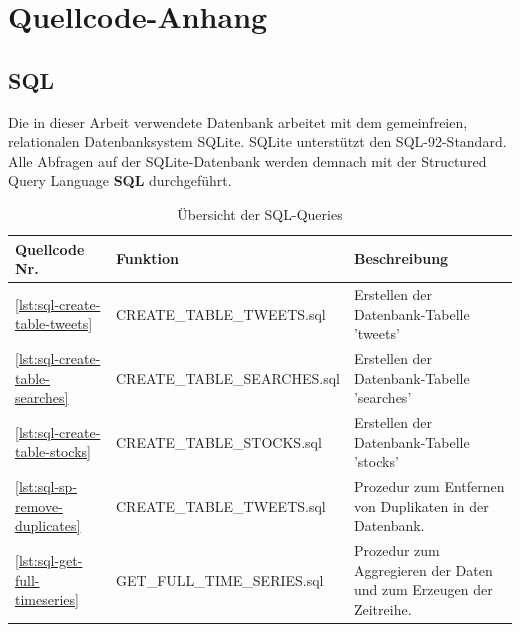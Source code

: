 \documentclass[
	a4paper,
	12pt,
	bibliography=totocnumbered,
	twoside,
]{scrreprt}
\begin{document}
\chapter{Quellcode-Anhang}

\section{SQL}
Die in dieser Arbeit verwendete Datenbank arbeitet mit dem gemeinfreien, relationalen Datenbanksystem SQLite. SQLite unterstützt den SQL-92-Standard. Alle Abfragen auf der SQLite-Datenbank werden demnach mit der Structured Query Language \textbf{SQL} durchgeführt.\\


\begin{table}[H]
	\centering
	\begin{tabular}{| p{1cm} | p{6cm} | p{9cm} |}
		\hline
		\rowcolor{tubs_blue_light}
		Quellcode Nr. & Funktion & Beschreibung \\ \hline
		\ref{lst:sql-create-table-tweets}  &  CREATE\_TABLE\_TWEETS.sql & Erstellen der Datenbank-Tabelle 'tweets' \\ \hline
		\ref{lst:sql-create-table-searches}  &  CREATE\_TABLE\_SEARCHES.sql & Erstellen der Datenbank-Tabelle 'searches' \\ \hline
		\ref{lst:sql-create-table-stocks}  &  CREATE\_TABLE\_STOCKS.sql & Erstellen der Datenbank-Tabelle 'stocks' \\ \hline
		\ref{lst:sql-sp-remove-duplicates}  &  CREATE\_TABLE\_TWEETS.sql & Prozedur zum Entfernen von Duplikaten in der Datenbank. \\ \hline
		\ref{lst:sql-get-full-timeseries}  &  GET\_FULL\_TIME\_SERIES.sql & Prozedur zum Aggregieren der Daten und zum Erzeugen der Zeitreihe. \\ \hline
	\end{tabular}
	\caption{Übersicht der SQL-Queries}
	\label{tab:sql-queries}
\end{table}



\newpage
\end{document}
